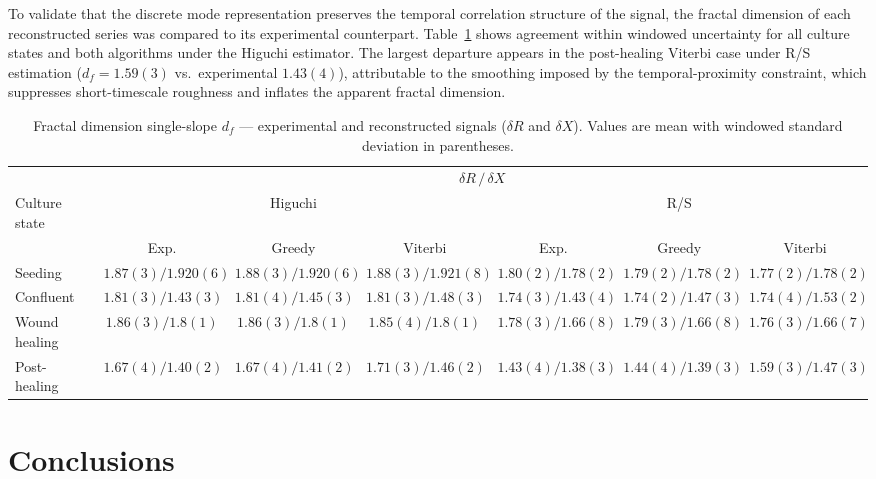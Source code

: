 \documentclass[english, 10pt, a4paper]{article}
\begin{document}
To validate that the discrete mode representation preserves the temporal correlation structure of the signal, the fractal dimension of each reconstructed series was compared to its experimental counterpart. Table~\ref{tab:fractal_comparison} shows agreement within windowed uncertainty for all culture states and both algorithms under the Higuchi estimator. The largest departure appears in the post-healing Viterbi case under R/S estimation ($d_f = 1.59(3)$ vs.\ experimental $1.43(4)$), attributable to the smoothing imposed by the temporal-proximity constraint, which suppresses short-timescale roughness and inflates the apparent fractal dimension.

\begin{table}[H]
  \centering
  \caption{Fractal dimension single-slope $d_f$ — experimental and reconstructed
   signals ($\delta R$ and $\delta X$). Values are mean with windowed standard
   deviation in parentheses.}
  \label{tab:fractal_comparison}
  \scriptsize
  \begin{tabular}{lcccccc}
  \toprule
   & \multicolumn{6}{c}{$\delta R\,/\,\delta X$} \\
  \cmidrule(lr){2-7}
  Culture state & \multicolumn{3}{c}{Higuchi} & \multicolumn{3}{c}{R/S} \\
  \cmidrule(lr){2-4}\cmidrule(lr){5-7}
   & Exp. & Greedy & Viterbi & Exp. & Greedy & Viterbi \\
  \midrule
  Seeding       & $1.87(3)/1.920(6)$ & $1.88(3)/1.920(6)$ & $1.88(3)/1.921(8)$  & $1.80(2)/1.78(2)$  & $1.79(2)/1.78(2)$  & $1.77(2)/1.78(2)$ \\
  Confluent     & $1.81(3)/1.43(3)$  & $1.81(4)/1.45(3)$  & $1.81(3)/1.48(3)$   & $1.74(3)/1.43(4)$  & $1.74(2)/1.47(3)$  & $1.74(4)/1.53(2)$ \\
  Wound healing & $1.86(3)/1.8(1)$   & $1.86(3)/1.8(1)$   & $1.85(4)/1.8(1)$    & $1.78(3)/1.66(8)$  & $1.79(3)/1.66(8)$  & $1.76(3)/1.66(7)$ \\
  Post-healing  & $1.67(4)/1.40(2)$  & $1.67(4)/1.41(2)$  & $1.71(3)/1.46(2)$   & $1.43(4)/1.38(3)$  & $1.44(4)/1.39(3)$  & $1.59(3)/1.47(3)$ \\
  \bottomrule
  \end{tabular}
\end{table}


\section{Conclusions }
\end{document}
